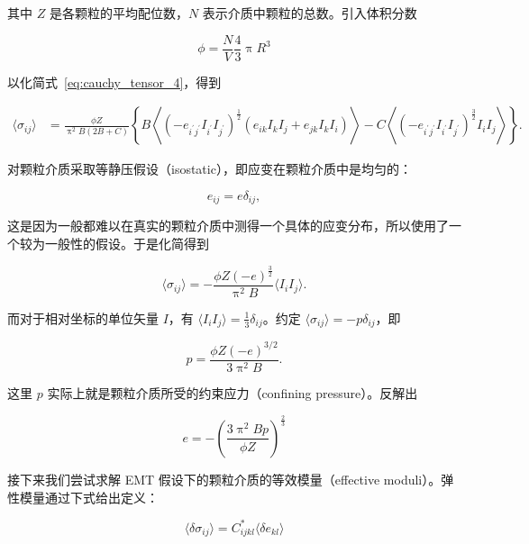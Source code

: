 其中 $Z$ 是各颗粒的平均配位数，$N$ 表示介质中颗粒的总数。引入体积分数

\begin{equation}
  \phi = \frac{N}{V}\frac{4}{3}\uppi R^3
\end{equation}

以化简式~\eqref{eq:cauchy_tensor_4}，得到

\begin{equation}
  \begin{aligned}
    \langle\sigma_{ij}\rangle &= \frac{\phi Z}{\uppi^{2}B(2B+C)}\left\{B\left\langle(-e_{i^{\prime}j^{\prime}}I_{i^{\prime}}I_{j^{\prime}})^{\frac{1}{2}}(e_{ik}I_{k}I_{j} + e_{jk}I_{k}I_{i})\right\rangle - C\left\langle(-e_{i^{\prime}j^{\prime}}I_{i^{\prime}}I_{j^{\prime}})^{\frac{3}{2}}I_{i}I_{j}\right\rangle\right\}.
  \end{aligned}\label{eq:cauchy_tensor_end}
\end{equation}

对颗粒介质采取等静压假设（isostatic），即应变在颗粒介质中是均匀的：

\begin{equation}
  e_{ij} = e\delta_{ij},
\end{equation}

这是因为一般都难以在真实的颗粒介质中测得一个具体的应变分布，所以使用了一个较为一般性的假设。于是化简得到

\begin{equation}
  \langle\sigma_{ij}\rangle = -\frac{\phi Z(-e)^{\frac{3}{2}}}{\uppi^{2}B}\langle I_{i}I_{j}\rangle.\label{eq:expected_value}
\end{equation}

而对于相对坐标的单位矢量 $I$，有 $\langle I_{i}I_{j}\rangle = \frac{1}{3}\delta_{ij}$。约定 $\langle\sigma_{ij}\rangle = -p\delta_{ij}$，即

\begin{equation}
  p = \frac{\phi Z(-e)^{3/2}}{3\uppi^{2}B}.
\end{equation}

这里 $p$ 实际上就是颗粒介质所受的约束应力（confining pressure）。反解出

\begin{equation}
  e = -\left(\frac{3\uppi^{2}Bp}{\phi Z}\right)^{\frac{2}{3}}
\end{equation}

接下来我们尝试求解 EMT 假设下的颗粒介质的等效模量（effective moduli）。弹性模量通过下式给出定义：

\begin{equation}
  \langle\delta\sigma_{ij}\rangle = C_{ijkl}^{*}\langle\delta e_{kl}\rangle\label{eq:modulus_definition}
\end{equation}

